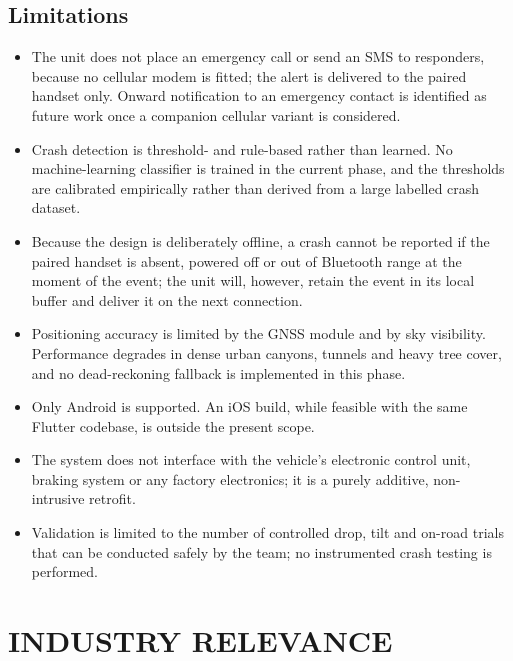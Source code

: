 \documentclass[12pt,a4paper,oneside]{report}
\begin{document}
\subsection{Limitations}

\begin{itemize}[leftmargin=*,itemsep=0.45em,topsep=0.6em]
\item The unit does not place an emergency call or send an SMS to responders, because no
cellular modem is fitted; the alert is delivered to the paired handset only. Onward
notification to an emergency contact is identified as future work once a companion cellular
variant is considered.

\item Crash detection is threshold- and rule-based rather than learned. No machine-learning
classifier is trained in the current phase, and the thresholds are calibrated empirically
rather than derived from a large labelled crash dataset.

\item Because the design is deliberately offline, a crash cannot be reported if the paired
handset is absent, powered off or out of Bluetooth range at the moment of the event; the
unit will, however, retain the event in its local buffer and deliver it on the next
connection.

\item Positioning accuracy is limited by the GNSS module and by sky visibility. Performance
degrades in dense urban canyons, tunnels and heavy tree cover, and no dead-reckoning
fallback is implemented in this phase.

\item Only Android is supported. An iOS build, while feasible with the same Flutter
codebase, is outside the present scope.

\item The system does not interface with the vehicle's electronic control unit, braking
system or any factory electronics; it is a purely additive, non-intrusive retrofit.

\item Validation is limited to the number of controlled drop, tilt and on-road trials that
can be conducted safely by the team; no instrumented crash testing is performed.
\end{itemize}

\section{INDUSTRY RELEVANCE}
\end{document}

